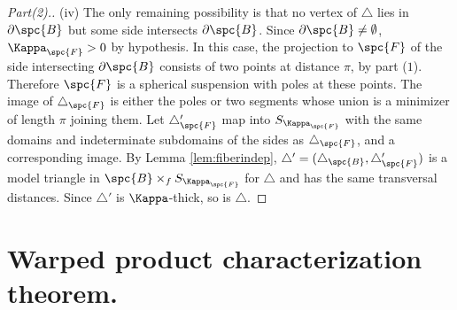 \begin{proof}[Part(2).]
(iv)  The only remaining possibility is that no vertex of $\triangle$
lies in $\partial \spc{B}$ but some side  intersects $\partial \spc{B}$. Since
$\partial \spc{B}\ne\emptyset$, $\Kappa_\spc{F}>0$ by hypothesis.  In this case, the
projection to $\spc{F}$ of the side intersecting $\partial \spc{B}$ consists of
two points at distance $\pi$, by part ($1$).  Therefore $\spc{F}$ is a
spherical suspension with poles at these points.  The image of
$\triangle_\spc{F}$ is either the poles or two segments whose union is  a
minimizer of length $\pi$ joining them.  Let $\triangle_\spc{F}'$ map into
$S_{\Kappa_\spc{F}}$ with the same domains and indeterminate subdomains of the
sides as $\triangle_\spc{F}$, and a corresponding image.  By Lemma
\ref{lem:fiberindep}, $\triangle'=(\triangle_\spc{B},\triangle_\spc{F}')$ is a
model triangle in  $\spc{B}\times_fS_{\Kappa_\spc{F}}$ for $\triangle$ and has the
same transversal distances.  Since $\triangle'$ is $\Kappa$-thick, so is
$\triangle$.
            
\end{proof}

\section{Warped product characterization theorem.}\label{sec:metric-min-surfaces}



